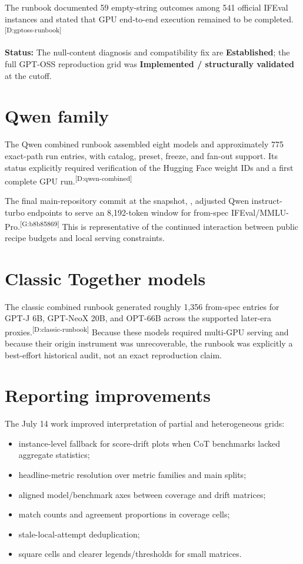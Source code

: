 \documentclass[11pt,oneside]{report}
\newcommand{\code}[1]{\texttt{\detokenize{#1}}}
\newcommand{\statusEstablished}{\textcolor{established}{\textbf{Established}}\xspace}
\newcommand{\statusImplemented}{\textcolor{implemented}{\textbf{Implemented / structurally validated}}\xspace}
\newcommand{\evmark}[1]{\allowbreak\textsuperscript{\scriptsize\textnormal{[#1]}}}
\newcommand{\docref}[1]{\evmark{D:#1}}
\newcommand{\gitref}[1]{\evmark{G:#1}}
\begin{document}
The runbook documented 59 empty-string outcomes among 541 official IFEval instances and stated that GPU end-to-end execution remained to be completed.\docref{gptoss-runbook}

\textbf{Status:} The null-content diagnosis and compatibility fix are \statusEstablished; the full GPT-OSS reproduction grid was \statusImplemented at the cutoff.

\section{Qwen family}

The Qwen combined runbook assembled eight models and approximately 775 exact-path run entries, with catalog, preset, freeze, and fan-out support. Its status explicitly required verification of the Hugging Face weight IDs and a first complete GPU run.\docref{qwen-combined}

The final main-repository commit at the snapshot, \code{b8b85869}, adjusted Qwen instruct-turbo endpoints to serve an 8,192-token window for from-spec IFEval/MMLU-Pro.\gitref{b8b85869} This is representative of the continued interaction between public recipe budgets and local serving constraints.

\section{Classic Together models}

The classic combined runbook generated roughly 1,356 from-spec entries for GPT-J 6B, GPT-NeoX 20B, and OPT-66B across the supported later-era proxies.\docref{classic-runbook} Because these models required multi-GPU serving and because their origin instrument was unrecoverable, the runbook was explicitly a best-effort historical audit, not an exact reproduction claim.

\section{Reporting improvements}

The July 14 work improved interpretation of partial and heterogeneous grids:

\begin{itemize}
  \item instance-level fallback for score-drift plots when CoT benchmarks lacked aggregate statistics;
  \item headline-metric resolution over metric families and main splits;
  \item aligned model/benchmark axes between coverage and drift matrices;
  \item match counts and agreement proportions in coverage cells;
  \item stale-local-attempt deduplication;
  \item square cells and clearer legends/thresholds for small matrices.
\end{itemize}
\end{document}
